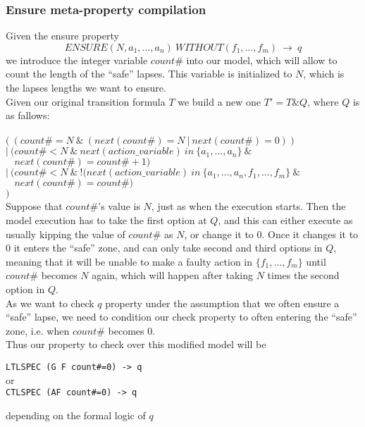 \documentclass[12pt]{article}
\begin{document}
\subsubsection*{Ensure meta-property compilation}
Given the ensure property $$ENSURE(N,a_1,...,a_n)~WITHOUT(f_1,...,f_m)~\rightarrow~q$$
we introduce the integer variable $count\#$ into our model, which will allow to count the length of the ``safe'' lapses. This variable is initialized to $N$, which is the lapses lengths we want to ensure.\\
Given our original transition formula $T$ we build a new one $T' = T \& Q$, where $Q$ is as fallows:\\\\
$ (~(count\# = N~\&~(next(count\#)=N~|~next(count\#)=0))$\\
$ |~(count\# < N~\&~next(action\_variable)~in~\{a_1,...,a_n\}~\&$\\
$~~~~next(count\#)=count\#+1)$\\
$ |~(count\# < N~\&~!(next(action\_variable)~in~\{a_1,...,a_n,f_1,...,f_m\}~\&$\\
$~~~~next(count\#)=count\#)$\\
$ )$\\
Suppose that $count\#$'s value is $N$, just as when the execution starts. Then the model execution has to take the first option at $Q$, and this can either execute as usually kipping the value of $count\#$ as $N$, or change it to $0$. Once it changes it to $0$ it enters the ``safe'' zone, and can only take second and third options in $Q$, meaning that it will be unable to make a faulty action in $\{f_1,...,f_m\}$ until $count\#$ becomes $N$ again, which will happen after taking $N$ times the second option in $Q$.\\
As we want to check $q$ property under the assumption that we often ensure a ``safe'' lapse, we need to condition our check property to often entering the ``safe'' zone, i.e. when $count\#$ becomes $0$.\\
Thus our property to check over this modified model will be
\begin{center}
\texttt{LTLSPEC (G~F~count\#=0) -> q}\\
or\\
\texttt{CTLSPEC (AF~count\#=0) -> q}
\end{center}
depending on the formal logic of $q$
\end{document}
